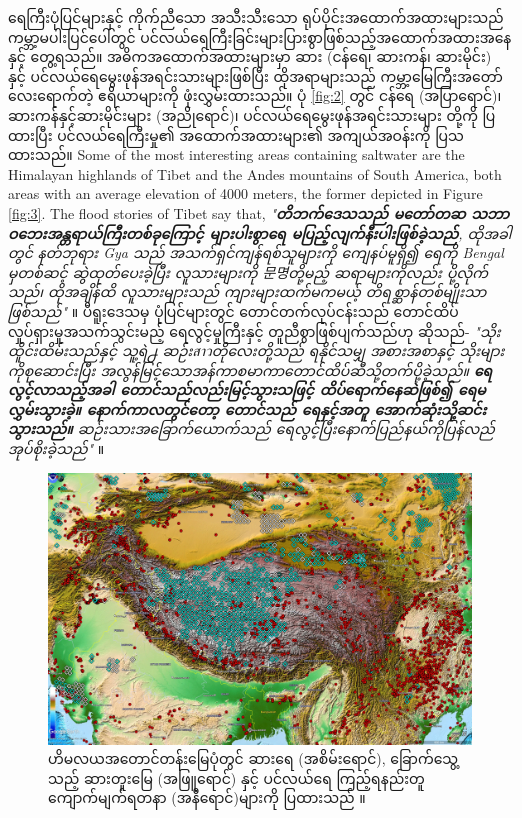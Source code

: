 \documentclass[10pt,twocolumn,letterpaper]{article}
\begin{document}
ရေကြီးပုံပြင်များနှင့် ကိုက်ညီသော အသီးသီးသော ရုပ်ပိုင်းအထောက်အထားများသည် ကမ္ဘာ့မပါးပြင်ပေါ်တွင် ပင်လယ်ရေကြီးခြင်းများပြားစွာဖြစ်သည့်အထောက်အထားအနေနှင့် တွေ့ရသည်။ အဓိကအထောက်အထားများမှာ ဆား (ငန်ရေ၊ ဆားကန်၊ ဆားမိုင်း) နှင့် ပင်လယ်ရေမွေးဖုန်အရင်းသားများဖြစ်ပြီး ထိုအရာများသည် ကမ္ဘာ့မြေကြီးအတော်လေးရောက်တဲ့ ဧရိယာများကို ဖုံးလွှမ်းထားသည်။ ပုံ \ref{fig:2} တွင် ငန်ရေ (အပြာရောင်)၊ ဆားကန်နှင့်ဆားမိုင်းများ (အညိုရောင်)၊ ပင်လယ်ရေမွေးဖုန်အရင်းသားများ \cite{15,16,86,87} တို့ကို ပြထားပြီး ပင်လယ်ရေကြီးမှု၏ အထောက်အထားများ၏ အကျယ်အဝန်းကို ပြသထားသည်။
Some of the most interesting areas containing saltwater are the Himalayan highlands of Tibet and the Andes mountains of South America, both areas with an average elevation of 4000 meters, the former depicted in Figure \ref{fig:3}. The flood stories of Tibet say that, \textit{"\textbf{တိဘက်ဒေသသည် မတော်တဆ သဘာဝဘေးအန္တရာယ်ကြီးတစ်ခုကြောင့် များပါးစွာရေ မပြည့်လျက်နီးပါးဖြစ်ခဲ့သည်}, ထိုအခါတွင် နတ်ဘုရား Gya သည် အသက်ရှင်ကျန်ရစ်သူများကို ကျေနပ်မူရှိ၍ ရေကို Bengal မှတစ်ဆင့် ဆွဲထုတ်ပေးခဲ့ပြီး လူသားများကို 문명တို့မည့် ဆရာများကိုလည်း ပို့လိုက်သည်၊ ထိုအချိန်ထိ လူသားများသည် ကျားများထက်မကမယ့် တိရစ္ဆာန်တစ်မျိုးသာဖြစ်သည်"} \cite{3}။ ပီရူးဒေသမှ ပုံပြင်များတွင် တောင်တက်လုပ်ငန်းသည် တောင်ထိပ်လှုပ်ရှားမှုအသက်သွင်းမည့် ရေလွင့်မှုကြီးနှင့် တူညီစွာဖြစ်ပျက်သည်ဟု ဆိုသည်- \textit{"သိုးထိူင်းထိမ်းသည်နှင့် သူ့ရဲ႕ ဆဉ်းสาวတိုလေးတို့သည် ရနိုင်သမျှ အစားအစာနှင့် သိုးများကိုစုဆောင်းပြီး အလွန်မြင့်သောအန်ကာစမာကာတောင်ထိပ်ဆီသို့တက်ပို့ခဲ့သည်။ \textbf{ရေလွင့်လာသည့်အခါ တောင်သည်လည်းမြင့်သွားသဖြင့် ထိပ်ရောက်နေဆဲဖြစ်၍ ရေမလွှမ်းသွားခဲ့။ နောက်ကာလတွင်တော့ တောင်သည် ရေနှင့်အတူ အောက်ဆုံးသို့ဆင်းသွားသည်။} ဆဉ်းသားအခြောက်ယောက်သည် ရေလွင့်ပြီးနောက်ပြည်နယ်ကိုပြန်လည်အုပ်စိုးခဲ့သည်"} \cite{3}။

\begin{figure}[t]
\begin{center}
   \includegraphics[width=1\linewidth]{tibet.jpg}
\end{center}
   \caption{ဟိမလယအတောင်တန်းမြေပုံတွင် ဆားရေ (အစိမ်းရောင်), ခြောက်သွေ့သည့် ဆားတူးမြေ (အဖြူရောင်) နှင့် ပင်လယ်ရေ ကြည့်ရနည်းတူ ကျောက်မျက်ရတနာ (အနီရောင်)များကို ပြထားသည် \cite{15,16,86,87}။}
\label{fig:3}
\label{fig:onecol}
\end{figure}
\end{document}
